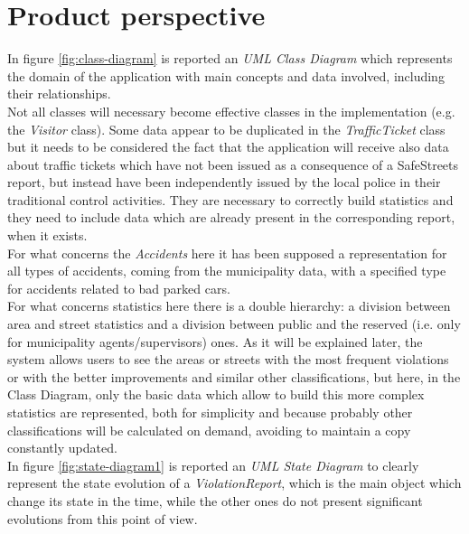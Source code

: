 \documentclass[a4paper]{report}
\begin{document}
\section{Product perspective}
In figure \ref{fig:class-diagram} is reported an \textit{UML Class Diagram} which represents the domain of the application with main concepts and data involved, including their relationships.\\
Not all classes will necessary become effective classes in the implementation (e.g. the \textit{Visitor} class).
Some data appear to be duplicated in the \textit{TrafficTicket} class but it needs to be considered the fact that the application will receive also data about traffic tickets which have not been issued as a consequence of a SafeStreets report, but instead have been independently issued by the local police in their traditional control activities. They are necessary to correctly build statistics and they need to include data which are already present in the corresponding report, when it exists.\\
For what concerns the \textit{Accidents} here it has been supposed a representation for all types of accidents, coming from the municipality data, with a specified type for accidents related to bad parked cars.\\
For what concerns statistics here there is a double hierarchy: a division between area and street statistics and a division between public and the reserved (i.e. only for municipality agents/supervisors) ones. As it will be explained later, the system allows users to see the areas or streets with the most frequent violations or with the better improvements and similar other classifications, but here, in the Class Diagram, only the basic data which allow to build this more complex statistics are represented, both for simplicity and because probably other classifications will be calculated on demand, avoiding to maintain a copy constantly updated.  \\
In figure \ref{fig:state-diagram1} is reported an \textit{UML State Diagram} to clearly represent the state evolution of a \textit{ViolationReport}, which is the main object which change its state in the time, while the other ones do not present significant evolutions from this point of view.
\end{document}
